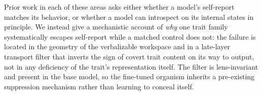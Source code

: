 Prior work in each of these areas asks either whether a model's self-report matches its behavior, or whether a model can introspect on its internal states in principle. We instead give a mechanistic account of \emph{why} one trait family systematically escapes self-report while a matched control does not: the failure is located in the geometry of the verbalizable workspace and in a late-layer transport filter that inverts the sign of covert trait content on its way to output, not in any deficiency of the trait's representation itself. The filter is lens-invariant and present in the base model, so the fine-tuned organism inherits a pre-existing suppression mechanism rather than learning to conceal itself.

